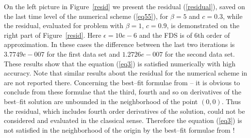\documentclass[leqno,11pt]{book}
\newcommand{\rf}[1]{(\ref{#1})}
\begin{document}
On the left picture in Figure~\ref{resid} we present  the residual \rf{residual}, saved on the last time level of the numerical scheme \rf{eq55},  for $\beta = 5$ and $c = 0.3$, while the residual, evaluated for problem with $\beta = 1$, $c = 0.9$, is demonstrated on the right part of Figure~\ref{resid}. Here  $\epsilon =10e-6$ and the FDS is of 6th order of approximation. In these cases the difference between the last two iterations is $3.7749e-007$ for the first data set and $1.2726e-007$ for the second data set. These results show that the  equation \rf{eq3} is satisfied numerically with high accuracy. 
Note that similar results about the residual for the numerical scheme in \cite{Ch2012} are not reported there. Concerning the best--fit formulae from \cite{Ch2011} -- it is obvious to conclude from these formulae that the third, fourth and so on derivatives of the best--fit solution are unbounded in the neighborhood of the point $(0,0)$. Thus  
the residual, which includes fourth order derivatives of the solution, could not be considered and evaluated in the classical sense. Therefore the equation \rf{eq3} is not satisfied in the neighborhood of the origin by the best--fit formulae  from \cite{Ch2011}!
\end{document}
